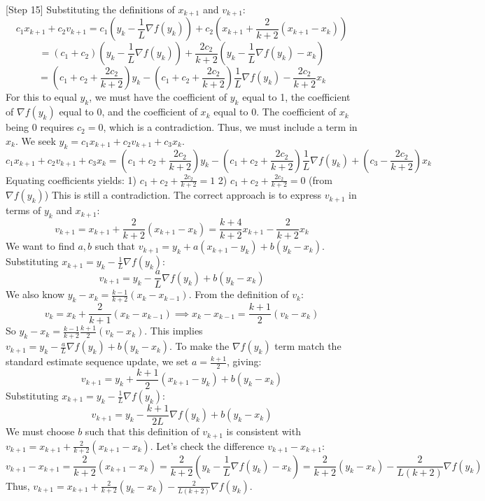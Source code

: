\documentclass{article}
\begin{document}
[Step 15] Substituting the definitions of $x_{k+1}$ and $v_{k+1}$:
$$c_1 x_{k+1} + c_2 v_{k+1} = c_1 \left(y_k - \frac{1}{L}\nabla f(y_k)\right) + c_2 \left(x_{k+1} + \frac{2}{k+2}(x_{k+1} - x_k)\right)$$
$$= (c_1 + c_2) \left(y_k - \frac{1}{L}\nabla f(y_k)\right) + \frac{2c_2}{k+2} \left(y_k - \frac{1}{L}\nabla f(y_k) - x_k\right)$$
$$= \left(c_1 + c_2 + \frac{2c_2}{k+2}\right) y_k - \left(c_1 + c_2 + \frac{2c_2}{k+2}\right) \frac{1}{L}\nabla f(y_k) - \frac{2c_2}{k+2} x_k$$
For this to equal $y_k$, we must have the coefficient of $y_k$ equal to 1, the coefficient of $\nabla f(y_k)$ equal to 0, and the coefficient of $x_k$ equal to 0. The coefficient of $x_k$ being 0 requires $c_2 = 0$, which is a contradiction. Thus, we must include a term in $x_k$. We seek $y_k = c_1 x_{k+1} + c_2 v_{k+1} + c_3 x_k$.
$$c_1 x_{k+1} + c_2 v_{k+1} + c_3 x_k = \left(c_1 + c_2 + \frac{2c_2}{k+2}\right) y_k - \left(c_1 + c_2 + \frac{2c_2}{k+2}\right) \frac{1}{L}\nabla f(y_k) + \left(c_3 - \frac{2c_2}{k+2}\right) x_k$$
Equating coefficients yields:
1) $c_1 + c_2 + \frac{2c_2}{k+2} = 1$
2) $c_1 + c_2 + \frac{2c_2}{k+2} = 0$ (from $\nabla f(y_k)$)
This is still a contradiction. The correct approach is to express $v_{k+1}$ in terms of $y_k$ and $x_{k+1}$:
$$v_{k+1} = x_{k+1} + \frac{2}{k+2}(x_{k+1} - x_k) = \frac{k+4}{k+2} x_{k+1} - \frac{2}{k+2} x_k$$
We want to find $a, b$ such that $v_{k+1} = y_k + a(x_{k+1} - y_k) + b(y_k - x_k)$.
Substituting $x_{k+1} = y_k - \frac{1}{L}\nabla f(y_k)$:
$$v_{k+1} = y_k - \frac{a}{L}\nabla f(y_k) + b(y_k - x_k)$$
We also know $y_k - x_k = \frac{k-1}{k+2}(x_k - x_{k-1})$. From the definition of $v_k$:
$$v_k = x_k + \frac{2}{k+1}(x_k - x_{k-1}) \implies x_k - x_{k-1} = \frac{k+1}{2}(v_k - x_k)$$
So $y_k - x_k = \frac{k-1}{k+2} \frac{k+1}{2}(v_k - x_k)$.
This implies $v_{k+1} = y_k - \frac{a}{L}\nabla f(y_k) + b(y_k - x_k)$. To make the $\nabla f(y_k)$ term match the standard estimate sequence update, we set $a = \frac{k+1}{2}$, giving:
$$v_{k+1} = y_k + \frac{k+1}{2}(x_{k+1} - y_k) + b(y_k - x_k)$$
Substituting $x_{k+1} = y_k - \frac{1}{L}\nabla f(y_k)$:
$$v_{k+1} = y_k - \frac{k+1}{2L}\nabla f(y_k) + b(y_k - x_k)$$
We must choose $b$ such that this definition of $v_{k+1}$ is consistent with $v_{k+1} = x_{k+1} + \frac{2}{k+2}(x_{k+1} - x_k)$. Let's check the difference $v_{k+1} - x_{k+1}$:
$$v_{k+1} - x_{k+1} = \frac{2}{k+2}(x_{k+1} - x_k) = \frac{2}{k+2}\left(y_k - \frac{1}{L}\nabla f(y_k) - x_k\right) = \frac{2}{k+2}(y_k - x_k) - \frac{2}{L(k+2)}\nabla f(y_k)$$
Thus, $v_{k+1} = x_{k+1} + \frac{2}{k+2}(y_k - x_k) - \frac{2}{L(k+2)}\nabla f(y_k)$.
\end{document}
